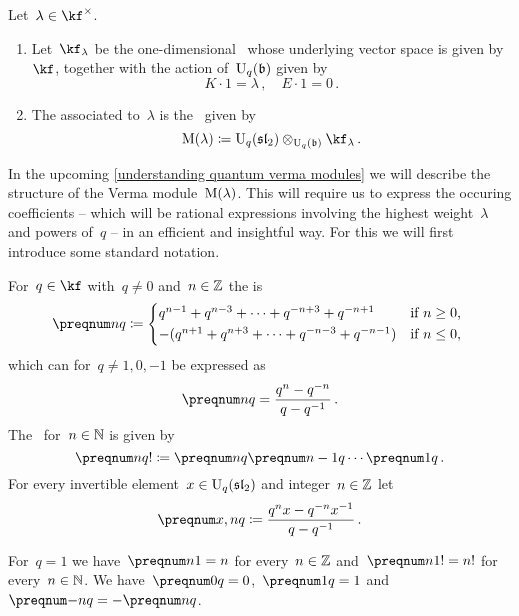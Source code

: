 \documentclass[a4paper, 11pt, oneside]{scrartcl}
\begin{document}
\begin{definition}
  Let~$\lambda \in \kf^\times$.
  \begin{enumerate}
    \item
      Let~$\kf_\lambda$ be the one-dimensional~ whose underlying vector space is given by~$\kf$, together with the action of~$\operatorname{U}_q(\mathfrak{b})$ given by
      \[
        K \cdot 1 = \lambda \,,
        \quad
        E \cdot 1 = 0 \,.
      \]
    \item
      The  associated to~$\lambda$ is the~ given by
      \[
        \verma(\lambda)
        \defined
        \Univ_q(\sllie_2) \tensor_{\Univ_q(\blie)} \kf_\lambda \,.
      \]
  \end{enumerate}
\end{definition}

In the upcoming \cref{understanding quantum verma modules} we will describe the structure of the Verma module~$\operatorname{M}(\lambda)$.
This will require us to express the occuring coefficients -- which will be rational expressions involving the highest weight~$\lambda$ and powers of~$q$ -- in an efficient and insightful way.
For this we will first introduce some standard notation.

\begin{definition}
  \label{definition of quantum integers}
  For~$q \in \kf$ with~$q \neq 0$ and~$n \in \mathbb{Z}$ the  is
  \[
    \qnum{n}
    \defined
    \begin{cases*}
      q^{n-1} + q^{n-3} + \dotsb + q^{-n+3} + q^{-n+1}
      &
      if~$n \geq 0$,
      \\
      -( q^{n+1} + q^{n+3} + \dotsb + q^{-n-3} + q^{-n-1} )
      &
      if~$n \leq 0$,
    \end{cases*}
  \]
  which can for~$q \neq 1, 0, -1$ be expressed as
  \[
    \qnum{n}
    =
    \frac{q^n - q^{-n}}{q - q^{-1}} \,.
  \]
  The~ for~$n \in \mathbb{N}$ is given by
  \[
    \qnum{n}!
    \defined
    \qnum{n} \qnum{n-1} \dotsm \qnum{1} \,.
  \]
  For every invertible element~$x \in \operatorname{U}_q(\mathfrak{sl}_2)$ and integer~$n \in \mathbb{Z}$ let
  \[
    \qnum{x, n}
    \defined
    \frac{ q^n x - q^{-n} x^{-1} }{ q - q^{-1} } \,.
  \]
\end{definition}

\begin{remark}
  For~$q = 1$ we have~$\qnum{n}[1] = n$ for every~$n \in \mathbb{Z}$ and~$\qnum{n}[1]! = n!$ for every~$n \in \mathbb{N}$.
  We have~$\qnum{0} = 0$,~$\qnum{1} = 1$ and~$\qnum{-n} = -\qnum{n}$.
\end{remark}
\end{document}

